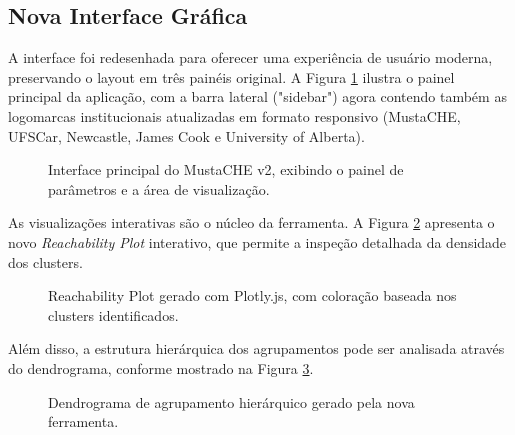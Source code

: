 \documentclass[12pt,a4paper]{article}
\begin{document}
\subsection{Nova Interface Gráfica}

A interface foi redesenhada para oferecer uma experiência de usuário moderna, preservando o layout em três painéis original. A Figura \ref{fig:dashboard} ilustra o painel principal da aplicação, com a barra lateral ("sidebar") agora contendo também as logomarcas institucionais atualizadas em formato responsivo (MustaCHE, UFSCar, Newcastle, James Cook e University of Alberta).

\begin{figure}[H]
    \centering
    \caption{Interface principal do MustaCHE v2, exibindo o painel de parâmetros e a área de visualização.}
    \label{fig:dashboard}
\end{figure}

As visualizações interativas são o núcleo da ferramenta. A Figura \ref{fig:reachability} apresenta o novo \textit{Reachability Plot} interativo, que permite a inspeção detalhada da densidade dos clusters.

\begin{figure}[H]
    \centering
    \caption{Reachability Plot gerado com Plotly.js, com coloração baseada nos clusters identificados.}
    \label{fig:reachability}
\end{figure}

Além disso, a estrutura hierárquica dos agrupamentos pode ser analisada através do dendrograma, conforme mostrado na Figura \ref{fig:dendrogram}.

\begin{figure}[H]
    \centering
    \caption{Dendrograma de agrupamento hierárquico gerado pela nova ferramenta.}
    \label{fig:dendrogram}
\end{figure}
\end{document}

